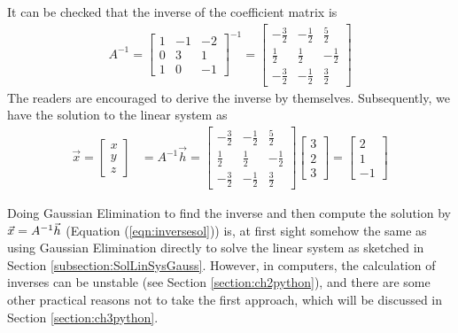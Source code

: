\begin{solution}
It can be checked that the inverse of the coefficient matrix is
\begin{align*}
A^{-1} =
\begin{bmatrix}
1 & -1 & -2 \\
0 & 3 & 1 \\
1 & 0 & -1
\end{bmatrix}^{-1}   
=
\begin{bmatrix}
-\frac{3}{2} & -\frac{1}{2} & \frac{5}{2} \\
\frac{1}{2} & \frac{1}{2} & -\frac{1}{2} \\
-\frac{3}{2} & -\frac{1}{2} & \frac{3}{2}
\end{bmatrix}
\end{align*}
The readers are encouraged to derive the inverse by themselves. Subsequently, we have the solution to the linear system as
\begin{align*}
\vec{x} = 
\begin{bmatrix}
x \\
y \\
z
\end{bmatrix}
&= A^{-1}\vec{h} =  
\begin{bmatrix}
-\frac{3}{2} & -\frac{1}{2} & \frac{5}{2} \\
\frac{1}{2} & \frac{1}{2} & -\frac{1}{2} \\
-\frac{3}{2} & -\frac{1}{2} & \frac{3}{2}
\end{bmatrix}
\begin{bmatrix}
3 \\
2 \\
3
\end{bmatrix}
=
\begin{bmatrix}
2 \\
1 \\
-1
\end{bmatrix}
\end{align*}
\end{solution}
Doing Gaussian Elimination to find the inverse and then compute the solution by $\vec{x} = A^{-1}\smash{\vec{h}}$ (Equation (\ref{eqn:inversesol})) is, at first sight somehow the same as using Gaussian Elimination directly to solve the linear system as sketched in Section \ref{subsection:SolLinSysGauss}. However, in computers, the calculation of inverses can be unstable (see Section \ref{section:ch2python}), and there are some other practical reasons not to take the first approach, which will be discussed in Section \ref{section:ch3python}. \par
